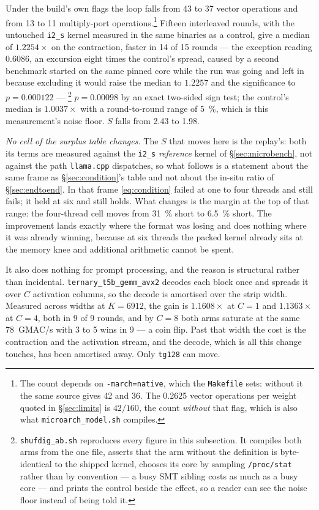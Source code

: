 \documentclass[11pt,a4paper]{article}
\newcommand{\code}[1]{\texttt{#1}}
\begin{document}
Under the build's own flags the loop falls from 43 to 37 vector operations and
from 13 to 11 multiply-port operations.\footnote{The count depends on
\code{-march=native}, which the \code{Makefile} sets: without it the same source
gives 42 and 36. The \num{0.2625} vector operations per weight quoted in
\S\ref{sec:limits} is $42/160$, the count \emph{without} that flag, which is
also what \code{microarch\_model.sh} compiles.} Fifteen interleaved rounds, with the
untouched \code{i2\_s} kernel measured in the same binaries as a control, give a
median of $\num{1.2254}\times$ on the contraction, faster in 14 of 15 rounds
--- the exception reading $\num{0.6086}$, an excursion eight times the control's
spread, caused by a second benchmark started on the same pinned core while the
run was going and left in because excluding it would raise the median to
$\num{1.2257}$ and the significance to $p=\num{0.000122}$ ---
\footnote{\code{shufdig\_ab.sh} reproduces every figure in this subsection. It
compiles both arms from the one file, asserts that the arm without the
definition is byte-identical to the shipped kernel, chooses its core by sampling
\code{/proc/stat} rather than by convention --- a busy SMT sibling costs as much
as a busy core --- and prints the control beside the effect, so a reader can see
the noise floor instead of being told it.}
$p=\num{0.00098}$ by an exact two-sided sign test; the control's median is
$\num{1.0037}\times$ with a round-to-round range of \SI{5}{\percent}, which is
this measurement's noise floor. $S$ falls from \num{2.43} to \num{1.98}.

\emph{No cell of the surplus table changes.} The $S$ that moves here is the
replay's: both its terms are measured against the \code{i2\_s} \emph{reference}
kernel of \S\ref{sec:microbench}, not against the path \code{llama.cpp}
dispatches, so what follows is a statement about the same frame as
\S\ref{sec:condition}'s table and not about the in-situ ratio of
\S\ref{sec:endtoend}. In that frame \eqref{eq:condition} failed at one
to four threads and still fails; it held at six and still holds. What changes is
the margin at the top of that range: the four-thread cell moves from
\SI{31}{\percent} short to \SI{6.5}{\percent} short. The improvement lands
exactly where the format was losing and does nothing where it was already
winning, because at six threads the packed kernel already sits at the memory
knee and additional arithmetic cannot be spent.

It also does nothing for prompt processing, and the reason is structural rather
than incidental. \code{ternary\_t5b\_gemm\_avx2} decodes each block once and
spreads it over $C$ activation columns, so the decode is amortised over the
strip width. Measured across widths at $K=\num{6912}$, the gain is
$\num{1.1608}\times$ at $C=1$ and $\num{1.1363}\times$ at $C=4$, both in 9 of 9
rounds, and by $C=8$ both arms saturate at the same \num{78}~GMAC/s
with 3 to 5 wins in 9 --- a coin flip. Past that width the cost is the
contraction and the activation stream, and the decode, which is all this change
touches, has been amortised away. Only \code{tg128} can move.
\end{document}
